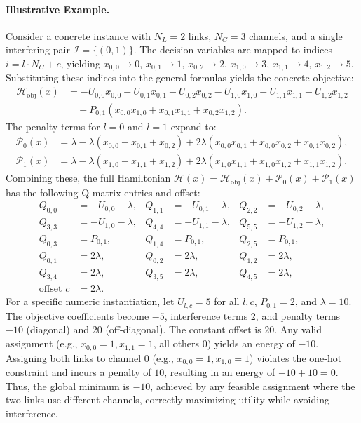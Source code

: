 \documentclass[12pt]{article}
\begin{document}
\paragraph{Illustrative Example.}
Consider a concrete instance with $N_L = 2$ links, $N_C = 3$ channels, and a single interfering pair $\mathcal{I} = \{(0,1)\}$. The decision variables are mapped to indices $i = l \cdot N_C + c$, yielding $x_{0,0} \to 0$, $x_{0,1} \to 1$, $x_{0,2} \to 2$, $x_{1,0} \to 3$, $x_{1,1} \to 4$, $x_{1,2} \to 5$. Substituting these indices into the general formulas yields the concrete objective:
\begin{align}
\mathcal{H}_{\text{obj}}(x) &= -U_{0,0}x_{0,0} - U_{0,1}x_{0,1} - U_{0,2}x_{0,2} - U_{1,0}x_{1,0} - U_{1,1}x_{1,1} - U_{1,2}x_{1,2} \nonumber \\
&\quad + P_{0,1}(x_{0,0}x_{1,0} + x_{0,1}x_{1,1} + x_{0,2}x_{1,2}).
\end{align}
The penalty terms for $l=0$ and $l=1$ expand to:
\begin{align}
\mathcal{P}_0(x) &= \lambda - \lambda(x_{0,0} + x_{0,1} + x_{0,2}) + 2\lambda(x_{0,0}x_{0,1} + x_{0,0}x_{0,2} + x_{0,1}x_{0,2}), \nonumber \\
\mathcal{P}_1(x) &= \lambda - \lambda(x_{1,0} + x_{1,1} + x_{1,2}) + 2\lambda(x_{1,0}x_{1,1} + x_{1,0}x_{1,2} + x_{1,1}x_{1,2}).
\end{align}
Combining these, the full Hamiltonian $\mathcal{H}(x) = \mathcal{H}_{\text{obj}}(x) + \mathcal{P}_0(x) + \mathcal{P}_1(x)$ has the following Q matrix entries and offset:
\begin{align}
Q_{0,0} &= -U_{0,0} - \lambda, & Q_{1,1} &= -U_{0,1} - \lambda, & Q_{2,2} &= -U_{0,2} - \lambda, \nonumber \\
Q_{3,3} &= -U_{1,0} - \lambda, & Q_{4,4} &= -U_{1,1} - \lambda, & Q_{5,5} &= -U_{1,2} - \lambda, \nonumber \\
Q_{0,3} &= P_{0,1}, & Q_{1,4} &= P_{0,1}, & Q_{2,5} &= P_{0,1}, \nonumber \\
Q_{0,1} &= 2\lambda, & Q_{0,2} &= 2\lambda, & Q_{1,2} &= 2\lambda, \nonumber \\
Q_{3,4} &= 2\lambda, & Q_{3,5} &= 2\lambda, & Q_{4,5} &= 2\lambda, \nonumber \\
\text{offset } c &= 2\lambda.
\end{align}
For a specific numeric instantiation, let $U_{l,c} = 5$ for all $l,c$, $P_{0,1} = 2$, and $\lambda = 10$. The objective coefficients become $-5$, interference terms $2$, and penalty terms $-10$ (diagonal) and $20$ (off-diagonal). The constant offset is $20$. Any valid assignment (e.g., $x_{0,0}=1, x_{1,1}=1$, all others $0$) yields an energy of $-10$. Assigning both links to channel $0$ (e.g., $x_{0,0}=1, x_{1,0}=1$) violates the one-hot constraint and incurs a penalty of $10$, resulting in an energy of $-10 + 10 = 0$. Thus, the global minimum is $-10$, achieved by any feasible assignment where the two links use different channels, correctly maximizing utility while avoiding interference.
\end{document}

